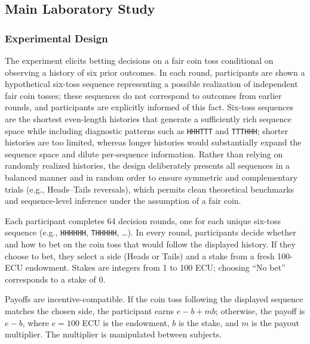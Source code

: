 \documentclass[11pt,a4paper]{article}
\numberwithin{equation}{section}
\begin{document}
\subsection{Main Laboratory Study}
\label{Sec:Study1}

\subsubsection{Experimental Design}
\label{Sec:Design}
	
The experiment elicits betting decisions on a fair coin toss conditional on observing a history of six prior outcomes. In each round, participants are shown a hypothetical six-toss sequence representing a possible realization of independent fair coin tosses; these sequences do not correspond to outcomes from earlier rounds, and participants are explicitly informed of this fact. Six-toss sequences are the shortest even-length histories that generate a sufficiently rich sequence space while including diagnostic patterns such as \texttt{HHHTTT} and \texttt{TTTHHH}; shorter histories are too limited, whereas longer histories would substantially expand the sequence space and dilute per-sequence information. Rather than relying on randomly realized histories, the design deliberately presents all sequences in a balanced manner and in random order to ensure symmetric and complementary trials (e.g., Heads--Tails reversals), which permits clean theoretical benchmarks and sequence-level inference under the assumption of a fair coin.

Each participant completes 64 decision rounds, one for each unique six-toss sequence (e.g., \texttt{HHHHHH}, \texttt{THHHHH}, \dots). In every round, participants decide whether and how to bet on the coin toss that would follow the displayed history. If they choose to bet, they select a side (Heads or Tails) and a stake from a fresh 100-ECU endowment. Stakes are integers from 1 to 100 ECU; choosing “No bet” corresponds to a stake of 0.
	
Payoffs are incentive-compatible. If the coin toss following the displayed sequence
matches the chosen side, the participant earns \( e - b + m b \); otherwise, the payoff
is \( e - b \), where \( e = 100 \) ECU is the endowment, \( b \) is the stake, and \( m \)
is the payout multiplier. The multiplier is manipulated between subjects.
\end{document}
